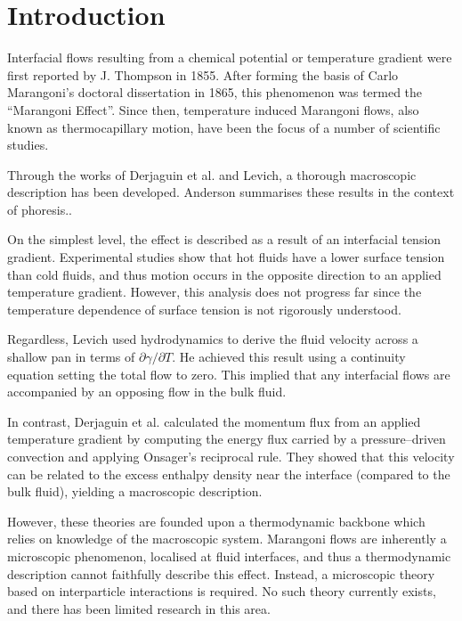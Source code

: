 \section{Introduction}
Interfacial flows resulting from a chemical potential or temperature gradient were first reported by J. Thompson in 1855.\cite{JThompson}
After forming the basis of Carlo Marangoni's doctoral dissertation in 1865, this phenomenon was termed the ``Marangoni Effect''.\cite{Marangoni}
Since then, temperature induced Marangoni flows, also known as thermocapillary motion, have been the focus of a number of scientific studies.

Through the works of Derjaguin et al.\cite{SurfaceForces} and Levich\cite{Levich}, a thorough macroscopic description has been developed.
Anderson summarises these results in the context of phoresis.\cite{Anderson}.

On the simplest level, the effect is described as a result of an interfacial tension gradient.
Experimental studies show that hot fluids have a lower surface tension than cold fluids,\cite{Ficalbi1972,Kayser1975} and thus motion occurs in the opposite direction to an applied temperature gradient.
However, this analysis does not progress far since the temperature dependence of surface tension is not rigorously understood.

Regardless, Levich used hydrodynamics to derive the fluid velocity across a shallow pan in terms of $\partial \gamma / \partial T$.\cite{Levich}
He achieved this result using a continuity equation setting the total flow to zero.
This implied that any interfacial flows are accompanied by an opposing flow in the bulk fluid.

In contrast, Derjaguin et al. calculated the momentum flux from an applied temperature gradient by computing the energy flux carried by a pressure--driven convection and applying Onsager's reciprocal rule.\cite{SurfaceForces}
They showed that this velocity can be related to the excess enthalpy density near the interface (compared to the bulk fluid), yielding a macroscopic description.

However, these theories are founded upon a thermodynamic backbone which relies on knowledge of the macroscopic system.
Marangoni flows are inherently a microscopic phenomenon, localised at fluid interfaces, and thus a thermodynamic description cannot faithfully describe this effect.
Instead, a microscopic theory based on interparticle interactions is required.
No such theory currently exists, and there has been limited research in this area.\cite{HolgerBoppHampe}

